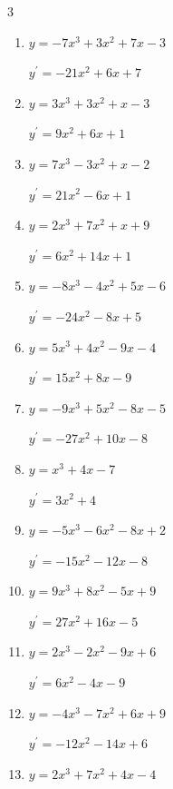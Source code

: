 \begin{multicols}{3}
\begin{enumerate}
        $\displaystyle y^{\prime}=6x^{2}-16x-3$

  \item $y=-7x^{3}+3x^{2}+7x-3$

        $\displaystyle y^{\prime}=-21x^{2}+6x+7$

  \item $y=3x^{3}+3x^{2}+x-3$

        $\displaystyle y^{\prime}=9x^{2}+6x+1$

  \item $y=7x^{3}-3x^{2}+x-2$

        $\displaystyle y^{\prime}=21x^{2}-6x+1$

\columnbreak %

  \item $y=2x^{3}+7x^{2}+x+9$

        $\displaystyle y^{\prime}=6x^{2}+14x+1$

  \item $y=-8x^{3}-4x^{2}+5x-6$

        $\displaystyle y^{\prime}=-24x^{2}-8x+5$

  \item $y=5x^{3}+4x^{2}-9x-4$

        $\displaystyle y^{\prime}=15x^{2}+8x-9$

  \item $y=-9x^{3}+5x^{2}-8x-5$

        $\displaystyle y^{\prime}=-27x^{2}+10x-8$

  \item $y=x^{3}+4x-7$

        $\displaystyle y^{\prime}=3x^{2}+4$

  \item $y=-5x^{3}-6x^{2}-8x+2$

        $\displaystyle y^{\prime}=-15x^{2}-12x-8$

  \item $y=9x^{3}+8x^{2}-5x+9$

        $\displaystyle y^{\prime}=27x^{2}+16x-5$

  \item $y=2x^{3}-2x^{2}-9x+6$

        $\displaystyle y^{\prime}=6x^{2}-4x-9$

  \item $y=-4x^{3}-7x^{2}+6x+9$

        $\displaystyle y^{\prime}=-12x^{2}-14x+6$

  \item $y=2x^{3}+7x^{2}+4x-4$


\end{enumerate}
\end{multicols}

